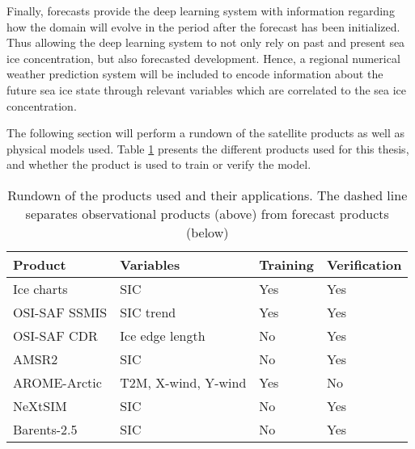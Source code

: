 \documentclass[../main/thesis.tex]{subfiles}
\begin{document}
Finally, forecasts provide the deep learning system with information regarding how the domain will evolve in the period after the forecast has been initialized. Thus allowing the deep learning system to not only rely on past and present sea ice concentration, but also forecasted development. Hence, a regional numerical weather prediction system will be included to encode information about the future sea ice state through relevant variables which are correlated to the sea ice concentration.

The following section will perform a rundown of the satellite products as well as physical models used. Table \ref{tab:data_overview} presents the different products used for this thesis, and whether the product is used to train or verify the model.

\begin{table}[]
    \caption{\label{tab:data_overview}Rundown of the products used and their applications. The dashed line separates observational products (above) from forecast products (below)}
    \centering
    \setlength{\arrayrulewidth}{0.5mm}
    \renewcommand{\arraystretch}{1.3}
    \begin{tabular}{llll}
    \hline
    Product             & Variables           & Training & Verification \\
    \hline
    Ice charts          & SIC                 & Yes      & Yes          \\
    OSI-SAF SSMIS       & SIC trend           & Yes      & Yes          \\
    OSI-SAF CDR         & Ice edge length     & No       & Yes          \\
    AMSR2               & SIC                 & No       & Yes          \\
    \hdashline
    AROME-Arctic        & T2M, X-wind, Y-wind & Yes      & No           \\
    NeXtSIM             & SIC                 & No       & Yes          \\
    Barents-2.5         & SIC                 & No       & Yes          \\
    \hline         
    \end{tabular}
\end{table}
\end{document}
